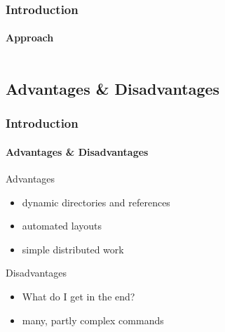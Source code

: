 
\begin{frame}
\frametitle{Introduction}
\framesubtitle{Approach}
\begin{columns}[onlytextwidth]
\begin{column}{0.40\textwidth}
\end{column}
\begin{column}{0.25\textwidth}
\end{column}
\begin{column}{0.25\textwidth}
\end{column}
\end{columns}
\end{frame}



\subsection{Advantages \& Disadvantages}
\begin{frame}
\frametitle{Introduction}
\framesubtitle{Advantages \& Disadvantages}
Advantages
\begin{itemize}
\item  dynamic directories and references
\item  automated layouts
\item  simple distributed work
\end{itemize}
Disadvantages
\begin{itemize}
\item  What do I get in the end?
\item  many, partly complex commands
\end{itemize}
\end{frame}


